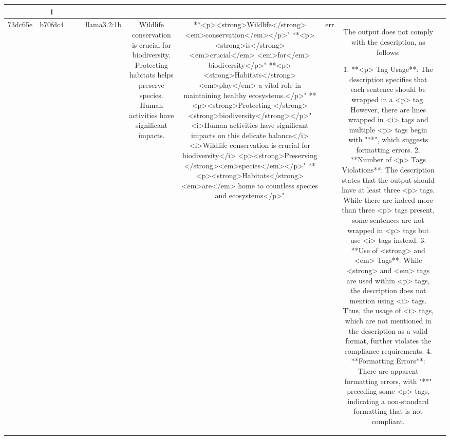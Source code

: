 \begin{table}[h!]
\begin{tabular}{|c|c|c|c|c|c|c|c|c|c|}
{{1. The chatbot description specifies that the paragraph should be split into individual sentences, with each sentence wrapped with a `<p>` tag. In this output, there is only one `<p>` tag provided, which violates the requirement that each sentence be wrapped with a `<p>` tag.

2. The description also states that there should be at least three `<p>` tags in the answer. Since there is only one `<p>` tag, this requirement is not met.

3. Inside the `<p>` tags, there should be one `<strong>` tag and multiple `<em>` tags to emphasize key words and phrases. While the output does include these tags, the primary violation is the insufficient number of `<p>` tags.

Due to the violation of having each sentence enclosed in a separate `<p>` tag and having at least three `<p>` tags, the chatbot's output does not comply with the provided description.

ERR & 1\\
\hline
73dc65e & b70fdc4 &  &  & llama3.2:1b & Wildlife conservation is crucial for biodiversity. Protecting habitats helps preserve species. Human activities have significant impacts. & **<p><strong>Wildlife</strong> <em>conservation</em></p>"
**<p><strong>is</strong> <em>crucial</em> <em>for</em> biodiversity</p>"
**<p><strong>Habitats</strong> <em>play</em> a vital role in maintaining healthy ecosystems.</p>"
**<p><strong>Protecting </strong><strong>biodiversity</strong></p>" 
<i>Human activities have significant impacts on this delicate balance</i>
<i>Wildlife conservation is crucial for biodiversity</i>
 <p><strong>Preserving </strong><em>species</em></p>"
**<p><strong>Habitats</strong> <em>are</em> home to countless species and ecosystems</p>" & err & The output does not comply with the description, as follows:

1. **<p> Tag Usage**: The description specifies that each sentence should be wrapped in a <p> tag. However, there are lines wrapped in <i> tags and multiple <p> tags begin with "**", which suggests formatting errors.
2. **Number of <p> Tags Violations**: The description states that the output should have at least three <p> tags. While there are indeed more than three <p> tags present, some sentences are not wrapped in <p> tags but use <i> tags instead.
3. **Use of <strong> and <em> Tags**: While <strong> and <em> tags are used within <p> tags, the description does not mention using <i> tags. Thus, the usage of <i> tags, which are not mentioned in the description as a valid format, further violates the compliance requirements.
4. **Formatting Errors**: There are apparent formatting errors, with "**" preceding some <p> tags, indicating a non-standard formatting that is not compliant.

}}
\end{tabular}
\end{table}
